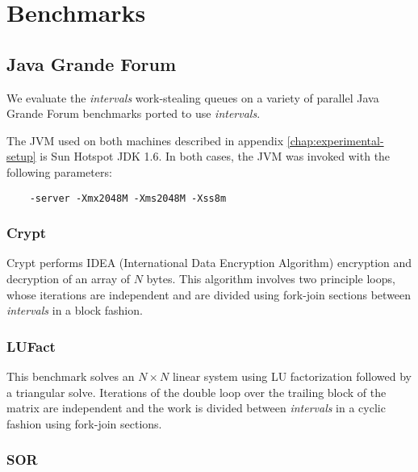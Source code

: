 
\chapter{Benchmarks}
\label{chap:appendix-benchmarks}

\section{Java Grande Forum}
\label{sec:benchmarks-jgf}

We evaluate the \emph{intervals} work-stealing queues on a variety of
parallel Java Grande Forum benchmarks \cite{Smith2001, Mathew1999,
  Gregg2003} ported to use \emph{intervals}.

The JVM used on both machines described in appendix
\ref{chap:experimental-setup} is Sun Hotspot JDK 1.6. In both cases,
the JVM was invoked with the following parameters:

\begin{verbatim}
    -server -Xmx2048M -Xms2048M -Xss8m
\end{verbatim}

\subsection*{Crypt}

Crypt performs IDEA (International Data Encryption Algorithm)
encryption and decryption of an array of $N$ bytes. This algorithm
involves two principle loops, whose iterations are independent and are
divided using fork-join sections between \emph{intervals} in a block fashion.

\subsection*{LUFact}

This benchmark solves an $N \times N$ linear system using LU factorization
followed by a triangular solve. Iterations of the double loop over the
trailing block of the matrix are independent and the work is divided
between \emph{intervals} in a cyclic fashion using fork-join sections.

\subsection*{SOR}

